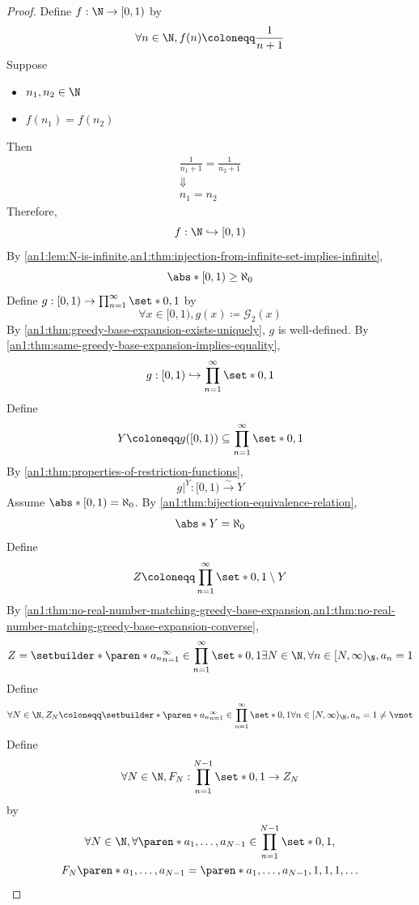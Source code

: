 \begin{proof}
  Define $f: \N \to [0, 1)$ by
  \[
    \forall n \in \N, f(n) \coloneqq \frac{1}{n + 1}
  \]
  Suppose
  \begin{itemize}
    \item $n_{1}, n_{2} \in \N$
    \item $f(n_{1}) = f(n_{2})$
  \end{itemize}
  Then
  \[
    \begin{array}{c}
      \frac{1}{n_{1} + 1} = \frac{1}{n_{2} + 1} \\
      \Downarrow                                \\
      n_{1} = n_{2}
    \end{array}
  \]
  Therefore,
  \[
    f: \N \hookrightarrow [0, 1)
  \]
  By \cref{an1:lem:N-is-infinite,an1:thm:injection-from-infinite-set-implies-infinite},
  \[
    \abs*{[0, 1)} \geq \aleph_{0}
  \]
  Define $g: [0, 1) \to \prod_{n = 1}^{\infty} \set*{0, 1}$ by
  \[
    \forall x \in [0, 1), g(x) \coloneqq \mathcal{G}_{2}(x)
  \]
  By \cref{an1:thm:greedy-base-expansion-exists-uniquely}, $g$ is well-defined.
  By \cref{an1:thm:same-greedy-base-expansion-implies-equality},
  \[
    g: [0, 1) \hookrightarrow \prod_{n = 1}^{\infty} \set*{0, 1}
  \]
  Define
  \[
    Y \coloneqq g([0, 1)) \subseteq \prod_{n = 1}^{\infty} \set*{0, 1}
  \]
  By \cref{an1:thm:properties-of-restriction-functions},
  \[
    g|^{Y}: [0, 1) \xrightarrow{\sim} Y
  \]
  Assume $\abs*{[0, 1)} = \aleph_{0}$. By \cref{an1:thm:bijection-equivalence-relation},
  \[
    \abs*{Y} = \aleph_{0}
  \]
  Define
  \[
    Z \coloneqq \prod_{n = 1}^{\infty} \set*{0, 1} \setminus Y
  \]
  By \cref{an1:thm:no-real-number-matching-greedy-base-expansion,an1:thm:no-real-number-matching-greedy-base-expansion-converse},
  \[
    Z = \setbuilder*{\paren*{a_{n}}_{n = 1}^{\infty} \in \prod_{n = 1}^{\infty}
    \set*{0, 1}}{\exists N \in \N, \forall n \in [N, \infty)_{\N}, a_{n} = 1}
  \]
  Define
  \[
    \forall N \in \N, Z_{N} \coloneqq \setbuilder*{\paren*{a_{n}}_{n = 1}^{\infty} \in
    \prod_{n = 1}^{\infty} \set*{0, 1}}{\forall n \in [N, \infty)_{\N}, a_{n} = 1} \neq \vnot
  \]
  Define
  \[
    \forall N \in \N, F_{N}: \prod_{n = 1}^{N - 1} \set*{0, 1} \to Z_{N}
  \]
  by
  \[
    \begin{gathered}
      \forall N \in \N, \forall \paren*{a_{1}, \ldots, a_{N - 1}} \in \prod_{n = 1}^{N - 1} \set*{0, 1}, \\
      F_{N}\paren*{a_{1}, \ldots, a_{N - 1}} = \paren*{a_{1}, \ldots, a_{N - 1}, 1, 1, 1, \ldots}

\end{gathered}\]
\end{proof}
